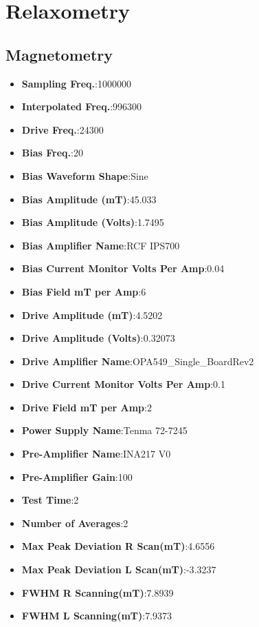 \documentclass{article}
\begin{document}
\section{Relaxometry}
\begin{itemize}
\section{Magnetometry}

\begin{itemize}	\item{\textbf{Sampling Freq.}:1000000}
	\item{\textbf{Interpolated Freq.}:996300}
	\item{\textbf{Drive Freq.}:24300}
	\item{\textbf{Bias Freq.}:20}
	\item{\textbf{Bias Waveform Shape}:Sine}
	\item{\textbf{Bias Amplitude (mT)}:45.033}
	\item{\textbf{Bias Amplitude (Volts)}:1.7495}
	\item{\textbf{Bias Amplifier Name}:RCF IPS700}
	\item{\textbf{Bias Current Monitor Volts Per Amp}:0.04}
	\item{\textbf{Bias Field mT per Amp}:6}
	\item{\textbf{Drive Amplitude (mT)}:4.5202}
	\item{\textbf{Drive Amplitude (Volts)}:0.32073}
	\item{\textbf{Drive Amplifier Name}:OPA549_Single_BoardRev2}
	\item{\textbf{Drive Current Monitor Volts Per Amp}:0.1}
	\item{\textbf{Drive Field mT per Amp}:2}
	\item{\textbf{Power Supply Name}:Tenma 72-7245}
	\item{\textbf{Pre-Amplifier Name}:INA217 V0}
	\item{\textbf{Pre-Amplifier Gain}:100}
	\item{\textbf{Test Time}:2}
	\item{\textbf{Number of Averages}:2}
	\item{\textbf{Max Peak Deviation R Scan(mT)}:4.6556}
	\item{\textbf{Max Peak Deviation L Scan(mT)}:-3.3237}
	\item{\textbf{FWHM R Scanning(mT)}:7.8939}
	\item{\textbf{FWHM L Scanning(mT)}:7.9373}
\begin{figure}[h] 

\end{figure}
\end{itemize}
\end{itemize}
\end{document}
